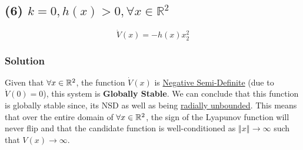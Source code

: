 \subsection*{(6) $k=0, h(x)>0, \forall x \in \mathbb{R}^{2}$}

$$
\dot{V}(x) = - h(x)x_2^2
$$

\subsubsection*{Solution} Given that $\forall x \in \mathbb{R}^2$, the function $\dot{V}(x)$ is \underline{Negative Semi-Definite} (due to $\dot{V}(0)=0$), this system is \textbf{Globally Stable}. We can conclude that this function is globally stable since, its NSD as well as being \underline{radially unbounded}. This means that over the entire domain of $\forall x \in \mathbb{R}^2$, the sign of the Lyapunov function will never flip and that the candidate function is well-conditioned as $\left\Vert x \right\Vert \rightarrow \infty$ such that $V(x) \rightarrow \infty$. 
